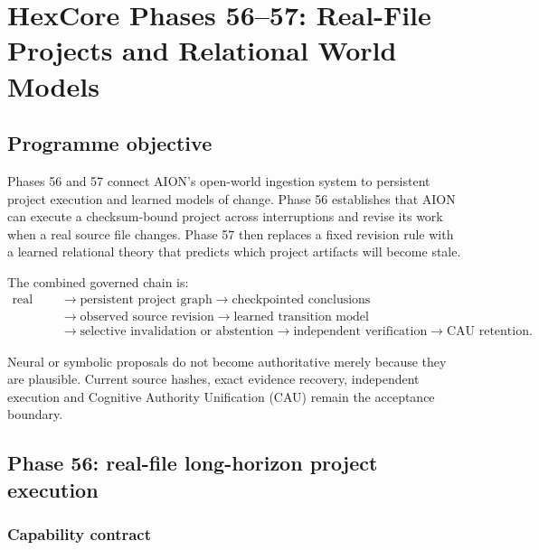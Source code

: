 \section{HexCore Phases 56--57: Real-File Projects and Relational World Models}
\label{sec:hexcore-phases-56-57}

\subsection{Programme objective}

Phases 56 and 57 connect AION's open-world ingestion system to persistent
project execution and learned models of change.  Phase 56 establishes that
AION can execute a checksum-bound project across interruptions and revise its
work when a real source file changes.  Phase 57 then replaces a fixed
revision rule with a learned relational theory that predicts which project
artifacts will become stale.

The combined governed chain is:
\[
\begin{aligned}
\text{real files}
&\rightarrow \text{persistent project graph}
\rightarrow \text{checkpointed conclusions}\\
&\rightarrow \text{observed source revision}
\rightarrow \text{learned transition model}\\
&\rightarrow \text{selective invalidation or abstention}
\rightarrow \text{independent verification}
\rightarrow \text{CAU retention}.
\end{aligned}
\]

Neural or symbolic proposals do not become authoritative merely because they
are plausible.  Current source hashes, exact evidence recovery, independent
execution and Cognitive Authority Unification (CAU) remain the acceptance
boundary.

\subsection{Phase 56: real-file long-horizon project execution}
\label{subsec:phase56-real-file-projects}

\subsubsection{Capability contract}

